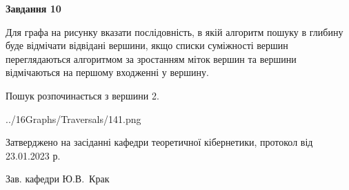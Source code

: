 \documentclass[12pt, ukrainian]{article}
\begin{document}
{\begin {large}
{\begin {center}\textbf{Завдання 10}\end {center}}\par
Для графа на рисунку вказати послідовність, в якій алгоритм пошуку в глибину буде відмічати відвідані вершини, якщо списки суміжності вершин переглядаються алгоритмом за зростанням міток вершин та вершини відмічаються на першому вход\-женні у вершину.\par
Пошук розпочинається з вершини 2.\par

\begin{center}
	{../16Graphs/Traversals/141.png}
\end{center}\par
\newpage


\end {large}
}
{\smallskip \begin {small} Затверджено на засіданні кафедри теоретичної кібернетики, протокол  від   23.01.2023 р.\par\smallskip\smallskip
{\parbox {6.5 cm}{Зав. кафедри \dotfill Ю.В.~Крак}} \end{small}}
\end{document}
